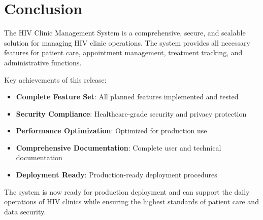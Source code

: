 \documentclass[12pt,a4paper]{article}
\begin{document}
\section{Conclusion}

The HIV Clinic Management System is a comprehensive, secure, and scalable solution for managing HIV clinic operations. The system provides all necessary features for patient care, appointment management, treatment tracking, and administrative functions.

Key achievements of this release:

\begin{itemize}
    \item \textbf{Complete Feature Set}: All planned features implemented and tested
    \item \textbf{Security Compliance}: Healthcare-grade security and privacy protection
    \item \textbf{Performance Optimization}: Optimized for production use
    \item \textbf{Comprehensive Documentation}: Complete user and technical documentation
    \item \textbf{Deployment Ready}: Production-ready deployment procedures
\end{itemize}

The system is now ready for production deployment and can support the daily operations of HIV clinics while ensuring the highest standards of patient care and data security.
\end{document}
